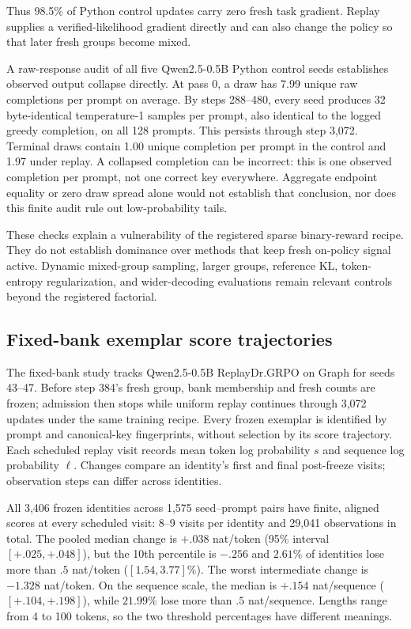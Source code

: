 \documentclass{article}
\newcommand{\1}{\mathbf 1}
\theoremstyle{remark}
\theoremstyle{definition}
\theoremstyle{plain}
\begin{document}
Thus 98.5\% of Python control updates carry zero fresh task gradient.
Replay supplies a verified-likelihood gradient directly and can also
change the policy so that later fresh groups become mixed.

A raw-response audit of all five Qwen2.5-0.5B Python control seeds establishes
observed output collapse directly. At pass 0, a draw has 7.99 unique raw
completions per prompt on average. By steps 288--480, every seed produces
32 byte-identical temperature-1 samples per prompt, also identical to the
logged greedy completion, on all 128 prompts. This persists through step
3,072. Terminal draws contain 1.00 unique completion per prompt in the
control and 1.97 under replay. A collapsed completion can be incorrect:
this is one observed completion per prompt, not one correct key everywhere.
Aggregate endpoint equality or zero draw spread alone would not establish
that conclusion, nor does this finite audit rule out low-probability tails.

These checks explain a vulnerability of the registered sparse binary-reward
recipe. They do not establish dominance over methods that keep fresh
on-policy signal active. Dynamic mixed-group sampling, larger groups,
reference KL, token-entropy regularization, and wider-decoding evaluations
remain relevant controls beyond the registered factorial.

\subsection{Fixed-bank exemplar score trajectories}
\label{app:fixed-bank-survival}

The fixed-bank study tracks Qwen2.5-0.5B ReplayDr.GRPO on Graph for seeds
43--47. Before step 384's fresh group, bank membership and fresh counts
are frozen; admission then stops while uniform replay continues through
3,072 updates under the same training recipe. Every frozen exemplar is
identified by prompt and canonical-key fingerprints, without selection by
its score trajectory. Each scheduled replay visit records mean token log
probability $s$ and sequence log probability $\ell$. Changes compare an
identity's first and final post-freeze visits; observation steps can differ
across identities.

All 3,406 frozen identities across 1,575 seed--prompt pairs have finite,
aligned scores at every scheduled visit: 8--9 visits per identity and
29,041 observations in total. The pooled median change is $+.038$
nat/token (95\% interval $[+.025,+.048]$), but the 10th percentile is
$-.256$ and $2.61\%$ of identities lose more than $.5$ nat/token
($[1.54,3.77]\%$). The worst intermediate change is $-1.328$ nat/token.
On the sequence scale, the median is $+.154$ nat/sequence
($[+.104,+.198]$), while $21.99\%$ lose more than $.5$ nat/sequence.
Lengths range from 4 to 100 tokens, so the two threshold percentages have
different meanings.
\end{document}
